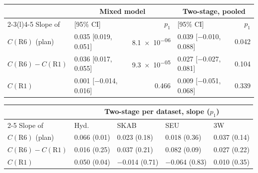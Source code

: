 \begin{tabular}{@{}l l r l r@{}}
\toprule
& \multicolumn{2}{c}{Mixed model} & \multicolumn{2}{c}{Two-stage, pooled} \\
\cmidrule(lr){2-3}\cmidrule(l){4-5}
Slope of & [95\% CI] & $p_1$ & [95\% CI] & $p_1$ \\
\midrule
$C(\mathrm{R6})$ (plan) & 0.035 [0.019, 0.051] & \num{8.1e-06} & 0.039 [$-$0.010, 0.088] & 0.042 \\
$C(\mathrm{R6})-C(\mathrm{R1})$ & 0.036 [0.017, 0.055] & \num{9.3e-05} & 0.027 [$-$0.027, 0.081] & 0.104 \\
$C(\mathrm{R1})$ & 0.001 [$-$0.014, 0.016] & 0.466 & 0.009 [$-$0.051, 0.068] & 0.339 \\
\bottomrule
\end{tabular}
\par\medskip
\begin{tabular}{@{}l llll@{}}
\toprule
& \multicolumn{4}{c}{Two-stage per dataset, slope ($p_1$)} \\
\cmidrule(l){2-5}
Slope of & Hyd. & SKAB & SEU & 3W \\
\midrule
$C(\mathrm{R6})$ (plan) & 0.066 (0.01) & 0.023 (0.18) & 0.018 (0.36) & 0.037 (0.14) \\
$C(\mathrm{R6})-C(\mathrm{R1})$ & 0.016 (0.25) & 0.037 (0.21) & 0.082 (0.09) & 0.027 (0.22) \\
$C(\mathrm{R1})$ & 0.050 (0.04) & $-$0.014 (0.71) & $-$0.064 (0.83) & 0.010 (0.35) \\
\bottomrule
\end{tabular}
